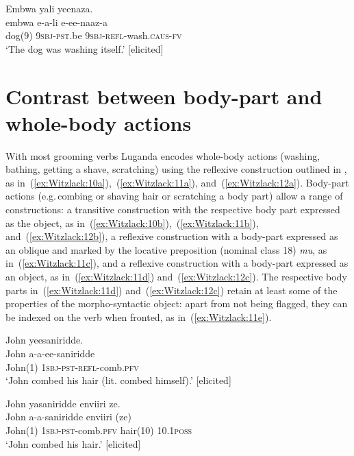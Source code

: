 \documentclass[output=paper,colorlinks,citecolor=brown,
]{langscibook}
\begin{document}
\ex \label{ex:Witzlack:9b}
	\glll Embwa yali yeenaza.\\
	    embwa 	e-a-li		e-ee-naaz-a\\
		dog(9) 	\textsc{9sbj}-\textsc{pst}.be \textsc{9sbj}-\textsc{refl}-wash.\textsc{caus}-\textsc{fv}\\
		\glt ‘The dog was washing itself.’ [elicited]

\z 
\z

\section{Contrast between body-part and whole-body actions}

With most grooming verbs Luganda encodes whole-body actions (washing, bath\-ing, getting a shave, scratching) using the reflexive construction outlined in , as in~(\ref{ex:Witzlack:10a}),~(\ref{ex:Witzlack:11a}), and~(\ref{ex:Witzlack:12a}). 
Body-part actions (e.g.\,combing or shaving hair or scratching a body part) allow a range of constructions: 
a transitive construction with the respective body part expressed as the object, as in~(\ref{ex:Witzlack:10b}),~(\ref{ex:Witzlack:11b}), and~(\ref{ex:Witzlack:12b}), a reflexive construction with a body-part expressed as an oblique and marked by the locative preposition (nominal class 18) \emph{mu}, as in~(\ref{ex:Witzlack:11c}), and a reflexive construction with a body-part expressed as an object, as in~(\ref{ex:Witzlack:11d}) and~(\ref{ex:Witzlack:12c}). 
The respective body parts in~(\ref{ex:Witzlack:11d}) and~(\ref{ex:Witzlack:12c}) retain at least some of the properties of the morpho-syntactic object: apart from not being flagged, they can be indexed on the verb when fronted, as in~(\ref{ex:Witzlack:11e}). 

\ea\label{ex:Witzlack:10}

\ea \label{ex:Witzlack:10a}
	\glll	John yeesaniridde.\\
           John	a-a-ee-saniridde\\
	John(1)	1\textsc{sbj}-\textsc{pst}-\textsc{refl}-comb.\textsc{pfv}\\
		\glt	‘John combed his hair (lit. combed himself).’ [elicited]

\ex \label{ex:Witzlack:10b}
	\glll John yasaniridde enviiri ze.\\
	    John	a-a-saniridde			enviiri		(ze)\\
	John(1)	\textsc{1sbj}-\textsc{pst}-comb.\textsc{pfv}	hair(10)		10.1\textsc{poss}\\
		\glt ‘John combed his hair.’ [elicited]
\end{document}
